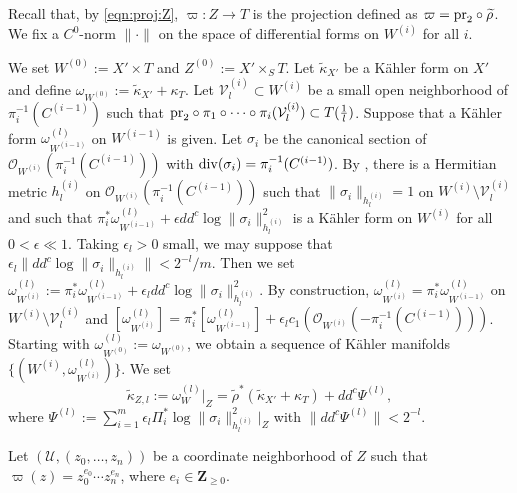 \documentclass[amscd, leqno]{amsart}
\theoremstyle{plain}
\theoremstyle{definition}
\theoremstyle{remark}
\begin{document}
Recall that, by \eqref{eqn:proj:Z}, $\varpi \colon Z \to T$ is the projection defined as $\varpi = {\rm pr}_{2} \circ \widetilde{\rho}$.
We fix a $C^{0}$-norm $\| \cdot \|$ on the space of differential forms on $W^{(i)}$ for all $i$.
\par
We set $W^{(0)} := X' \times T$ and $Z^{(0)} := X' \times_{S} T$. Let $\widetilde{\kappa}_{X'}$ be a K\"ahler form on $X'$ and 
define $\omega_{W^{(0)}} := \widetilde{\kappa}_{X'} + \kappa_{T}$. 
Let ${\mathcal V}^{(i)}_{l}\subset W^{(i)}$ be a small open neighborhood of $\pi_{i}^{-1}(C^{(i-1)})$ such that
${\rm pr}_{2}\circ\pi_{1}\circ\cdots\circ\pi_{i}({\mathcal V}^{(i)}_{l})\subset T(\frac{1}{l})$.
Suppose that a K\"ahler form $\omega_{W^{(i-1)}}^{(l)}$ on $W^{(i-1)}$ is given. 
Let $\sigma_{i}$ be the canonical section of ${\mathcal O}_{W^{(i)}}(\pi_{i}^{-1}(C^{(i-1)}))$ with ${\rm div}(\sigma_{i}) = \pi_{i}^{-1}(C^{(i-1)})$.
By \cite[Chap.VII, Prop.\,12.4]{Demailly12}, there is a Hermitian metric $h^{(i)}_{l}$ on ${\mathcal O}_{W^{(i)}}(\pi_{i}^{-1}(C^{(i-1)}))$ 
such that $\| \sigma_{i} \|_{h^{(i)}_{l}} = 1$ on $W^{(i)}\setminus{\mathcal V}^{(i)}_{l}$ and such that 
$\pi_{i}^{*}\omega_{W^{(i-1)}}^{(l)} + \epsilon dd^{c}\log \| \sigma_{i}\|_{h^{(i)}_{l}}^{2}$ is a K\"ahler form on $W^{(i)}$ 
for all $0 < \epsilon \ll 1$.
Taking $\epsilon_{l}>0$ small, we may suppose that $\epsilon_{l} \| dd^{c} \log \| \sigma_{i} \|_{h^{(i)}_{l}} \| < 2^{-l}/m$.
Then we set ${\omega}_{W^{(i)}}^{(l)} := \pi_{i}^{*} \omega_{W^{(i-1)}}^{(l)} + \epsilon_{l} dd^{c} \log \| \sigma_{i} \|_{h^{(i)}_{l}}^{2}$.
By construction, ${\omega}_{W^{(i)}}^{(l)} = \pi_{i}^{*}\omega_{W^{(i-1)}}^{(l)}$ on $W^{(i)}\setminus{\mathcal V}^{(i)}_{l}$ and 
$[{\omega}_{W^{(i)}}^{(l)}] = \pi_{i}^{*}[ \omega_{W^{(i-1)}}^{(l)} ] + \epsilon_{l} c_{1}({\mathcal O}_{W^{(i)}}(-\pi_{i}^{-1}(C^{(i-1)})))$.
Starting with $\omega_{W^{(0)}}^{(l)} := \omega_{W^{(0)}}$, 
we obtain a sequence of K\"ahler manifolds $\{(W^{(i)}, {\omega}_{W^{(i)}}^{(l)})\}$. We set
\begin{equation}
\label{eqn:(A.1)}
\widetilde{\kappa}_{Z,l} := {\omega}_{W}^{(l)}|_{Z} = \widetilde{\rho}^{*}( \widetilde{\kappa}_{X'} + \kappa_{T} ) + dd^{c}\Psi^{(l)},
\end{equation}
where $\Psi^{(l)} := \sum_{i=1}^{m} \epsilon_{l} \varPi_{i}^{*} \log \| \sigma_{i}\|_{h^{(i)}_{l}}^{2} |_{Z}$ with $\| dd^{c} \Psi^{(l)} \| < 2^{-l}$.
\par
Let $({\mathcal U}, (z_{0},\ldots,z_{n}))$ be a coordinate neighborhood of $Z$ such that 
$\varpi(z) = z_{0}^{e_{0}} \cdots z_{n}^{e_{n}}$, where $e_{i} \in {\mathbf Z}_{\geq0}$.
\end{document}
